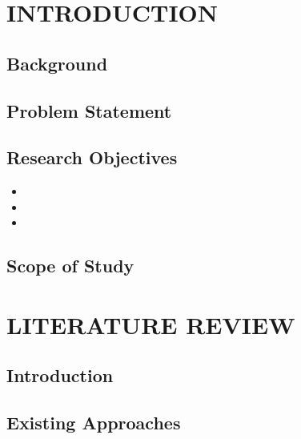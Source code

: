\documentclass{SOICTthesis}  %
\begin{document}
\theabstract{
    \lipsum[1-2]  %
}


\chapter{INTRODUCTION}
\section{Background}
\lipsum[3-5]  %
\cite{b1, b3}

\section{Problem Statement}
\lipsum[6-7]
\cite{b2, b4}

\section{Research Objectives}
\begin{itemize}
    \item \lipsum[8]
    \item \lipsum[9]
    \item \lipsum[10]
\end{itemize}

\section{Scope of Study}
\lipsum[11-12]

\chapter{LITERATURE REVIEW}
\section{Introduction}
\lipsum[13-15]
\cite{b5, b7}

\section{Existing Approaches}
\lipsum[16-18]
\cite{b6, b8}
\end{document}
